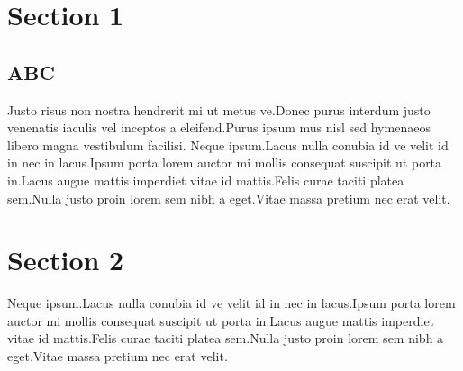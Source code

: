 \documentclass{scrbook}
\begin{document}
\section{Section 1}
\subsection{ABC}
\beginnumbering
\pstart
\centering
Justo risus non nostra hendrerit mi ut metus ve.Donec purus interdum justo venenatis iaculis vel inceptos a eleifend.Purus ipsum mus nisl sed hymenaeos libero magna vestibulum facilisi.
\pend
\endnumbering
Neque ipsum.Lacus nulla conubia id ve velit id in nec in lacus.Ipsum porta lorem auctor mi mollis consequat suscipit ut porta in.Lacus augue mattis imperdiet vitae id mattis.Felis curae taciti platea sem.Nulla justo proin lorem sem nibh a eget.Vitae massa pretium nec erat velit.

\section{Section 2}
Neque ipsum.Lacus nulla conubia id ve velit id in nec in lacus.Ipsum porta lorem auctor mi mollis consequat suscipit ut porta in.Lacus augue mattis imperdiet vitae id mattis.Felis curae taciti platea sem.Nulla justo proin lorem sem nibh a eget.Vitae massa pretium nec erat velit.
\end{document}
